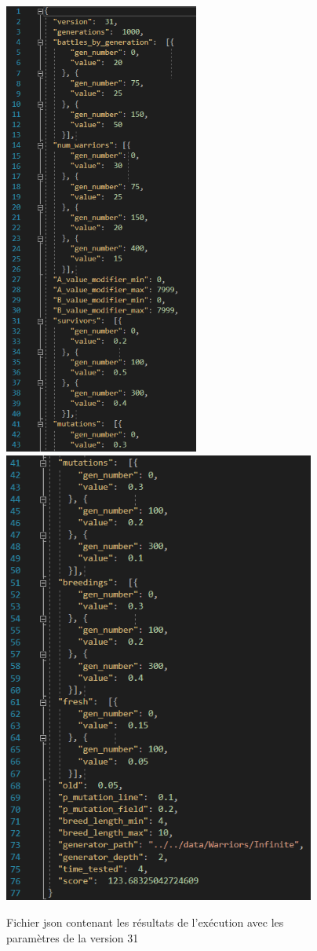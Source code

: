 \documentclass[french]{article}
\begin{document}
\begin{enumerate}
                    \begin{figure}[!h]
                    \includegraphics[height=15cm]{image/Resultats1.png} \includegraphics[height=15cm]{image/Resultats2.png}
                        \caption{Fichier json contenant les résultats de l'exécution avec les paramètres de la version 31}
                    \end{figure}
            \end{enumerate}
        \newpage
\end{document}

